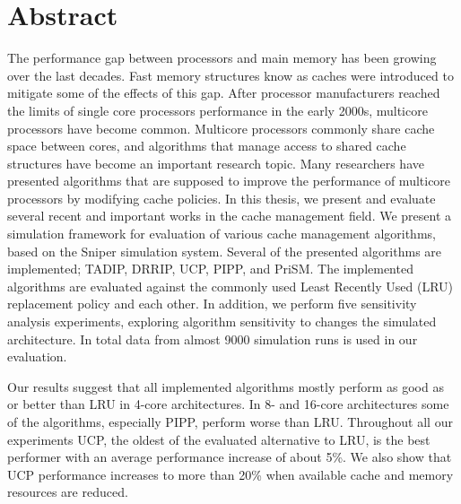 
\section*{Abstract}

The performance gap between processors and main memory has been growing over the last decades.
Fast memory structures know as caches were introduced to mitigate some of the effects of this gap.
After processor manufacturers reached the limits of single core processors performance in the early 2000s, multicore processors have become common.
Multicore processors commonly share cache space between cores, and algorithms that manage access to shared cache structures have become an important research topic.
Many researchers have presented algorithms that are supposed to improve the performance of multicore processors by modifying cache policies.
In this thesis, we present and evaluate several recent and important works in the cache management field.
We present a simulation framework for evaluation of various cache management algorithms, based on the Sniper simulation system.
Several of the presented algorithms are implemented; TADIP, DRRIP, UCP, PIPP, and PriSM.
The implemented algorithms are evaluated against the commonly used Least Recently Used (LRU) replacement policy and each other.
In addition, we perform five sensitivity analysis experiments, exploring algorithm sensitivity to changes the simulated architecture.
In total data from almost 9000 simulation runs is used in our evaluation.

Our results suggest that all implemented algorithms mostly perform as good as or better than LRU in 4-core architectures.
In 8- and 16-core architectures some of the algorithms, especially PIPP, perform worse than LRU.
Throughout all our experiments UCP, the oldest of the evaluated alternative to LRU, is the best performer with an average performance increase of about 5\%.
We also show that UCP performance increases to more than 20\% when available cache and memory resources are reduced.

\clearpage

